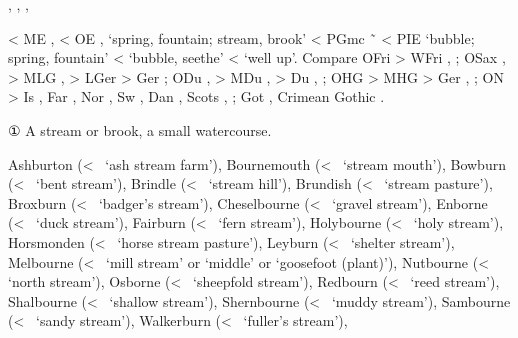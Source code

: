 \documentclass[12pt,letterpaper,oneside,article,draft]{memoir}
\begin{document}
\begin{Lemma}
\begin{Also}
	, , , 
\end{Also}
\begin{Etymology}
	< ME ,  < OE ,  ‘spring, fountain; stream, brook’
		< PGmc  \~\  < PIE  ‘bubble; spring, fountain’
		<  ‘bubble, seethe’ <  ‘well up’.
	Compare
	OFri  > WFri , ;
	OSax ,  > MLG ,  > LGer  > Ger ;
	ODu ,  > MDu ,  > Du , ;
	OHG  > MHG  > Ger , ;
	ON  > Is , Far , Nor , Sw , Dan ,
		Scots , ;
	Got  , Crimean Gothic .
\end{Etymology}
\begin{Definitions}
	① A stream or brook, a small watercourse.
\end{Definitions}
\begin{Examples}
	Ashburton (<~ ‘ash stream farm’),
	Bournemouth (<~ ‘stream mouth’),
	Bowburn (<~ ‘bent stream’),
	Brindle (<~ ‘stream hill’),
	Brundish (<~ ‘stream pasture’),
	Broxburn (<~ ‘badger’s stream’),
	Cheselbourne (<~ ‘gravel stream’),
	Enborne (<~ ‘duck stream’),
	Fairburn (<~ ‘fern stream’),
	Holybourne (<~ ‘holy stream’),
	Horsmonden (<~ ‘horse stream pasture’),
	Leyburn (<~ ‘shelter stream’),
	Melbourne (<~ ‘mill stream’ or  ‘middle’ or  ‘goosefoot (plant)’),
	Nutbourne (<~ ‘north stream’),
	Osborne (<~ ‘sheepfold stream’),
	Redbourn (<~ ‘reed stream’),
	Shalbourne (<~ ‘shallow stream’),
	Shernbourne (<~ ‘muddy stream’),
	Sambourne (<~ ‘sandy stream’),
	Walkerburn (<~ ‘fuller’s stream’),
\end{Examples}
\end{Lemma}
\end{document}
